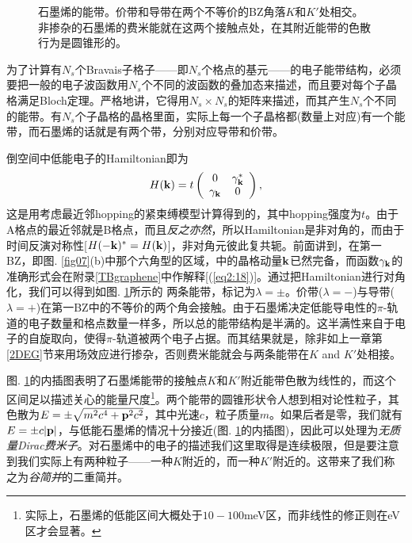 \documentclass[10pt]{book}
\newcommand{\bp}{{\bf p}}
\newcommand{\bk}{{\bf k}}
\newcommand{\beq}{\begin{equation}}
\newcommand{\eeq}{\end{equation}}
\newcommand\itt{\it\color{blue}}
\begin{document}
\begin{figure}
\begin{center}
\end{center}
\caption{ 石墨烯的能带。价带和导带在两个不等价的BZ角落$K$和$K'$处相交。非掺杂的石墨烯的费米能就在这两个接触点处，在其附近能带的色散行为是圆锥形的。}
\label{fig08}
\end{figure}

为了计算有$N_s$个Bravais子格子——即$N_s$个格点的基元——的电子能带结构，必须要把一般的电子波函数用$N_s$个不同的波函数的叠加态来描述，而且要对每个子晶格满足Bloch定理\cite{AM,kittel}。严格地讲，它得用$N_s\times N_s$的矩阵来描述，而其产生$N_s$个不同的能带。有$N_s$个子晶格的晶格里面，实际上每一个子晶格都(数量上对应)有一个能带，而石墨烯的话就是有两个带，分别对应导带和价带。

倒空间中低能电子的Hamiltonian即为
\beq\label{raw}
H(\bk)=t\left(\begin{array}{cc}
0 & \gamma_{\bk}^* \\ \gamma_{\bk} & 0
        \end{array}\right),
\eeq
这是用考虑最近邻hopping的紧束缚模型计算得到的，其中hopping强度为$t$。由于A格点的最近邻就是B格点，而且{\it 反之亦然}，所以Hamiltonian是非对角的，而由于时间反演对称性[$H(-\bk)^*=H(\bk)$]，非对角元彼此复共轭。前面讲到，在第一BZ，即图. \ref{fig07}(b)中那个六角型的区域，中的晶格动量$\bk$已然完备，而函数$\gamma_{\bk}$的准确形式会在附录\ref{TBgraphene}中作解释[(\ref{eq2:18})]。通过把Hamiltonian进行对角化，我们可以得到如图. \ref{fig08}所示的 两条能带，标记为$\lambda=\pm$。价带($\lambda=-$)与导带($\lambda=+$)在第一BZ中的不等价的两个角会接触。由于石墨烯决定低能导电性的$\pi$-轨道的电子数量和格点数量一样多，所以总的能带结构是半满的。这半满性来自于电子的自旋取向，使得$\pi$-轨道被两个电子占据。而其结果就是，除非如上一章第\ref{2DEG}节来用场效应进行掺杂，否则费米能就会与两条能带在$K$ and $K'$处相接。

图. \ref{fig08}的内插图表明了石墨烯能带的接触点$K$和$K'$附近能带色散为线性的，而这个区间足以描述关心的能量尺度\footnote{实际上，石墨烯的低能区间大概处于$10-100$meV区，而非线性的修正则在eV区才会显著。}。两个能带的圆锥形状令人想到相对论性粒子，其色散为$E=\pm\sqrt{m^2c^4 + \bp^2 c^2}$，其中光速$c$，粒子质量$m$。如果后者是零，我们就有$E=\pm c|\bp|$，与低能石墨烯的情况十分接近(图. \ref{fig08}的内插图)，因此可以处理为{\itt 无质量Dirac费米子}。对石墨烯中的电子的描述我们这里取得是连续极限，但是要注意到我们实际上有两种粒子——一种$K$附近的，而一种$K'$附近的。这带来了我们称之为{\itt 谷简并}的二重简并。
\end{document}
